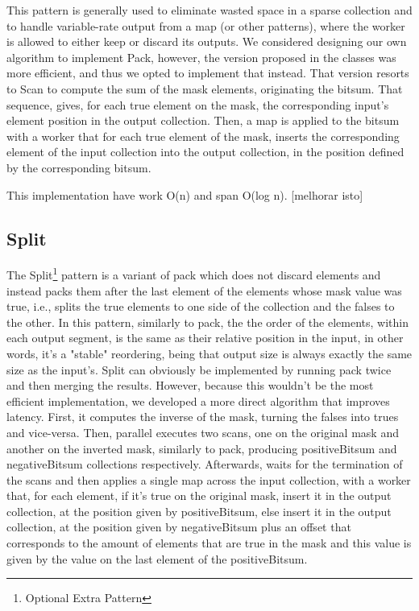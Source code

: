 \documentclass[conference,compsoc]{IEEEtran}
\begin{document}
This pattern is generally used to eliminate wasted space in a sparse collection and to handle variable-rate output from a map (or other patterns), where the worker is allowed to either keep or discard its outputs.
We considered designing our own algorithm to implement Pack, however, the version proposed in the classes was more efficient, and thus we opted to implement that instead. That version resorts to Scan to compute the sum of the mask elements, originating the bitsum. That sequence, gives, for each true element on the mask, the corresponding input's element position in the output collection. Then, a map is applied to the bitsum with a worker that for each true element of the mask, inserts the corresponding element of the input collection into the output collection, in the position defined by the corresponding bitsum.

This implementation have work O(n) and span O(log n). [melhorar isto]

\subsection{Split}

The Split\footnote[1]{Optional Extra Pattern} pattern is a variant of pack which does not discard elements and instead packs them after the last element of the elements whose mask value was true, i.e., splits the true elements to one side of the collection and the falses to the other.
In this pattern, similarly to pack, the the order of the elements, within each output segment, is the same as their relative position in the input, in other words, it's a "stable" reordering, being that output size is always exactly the same size as the input's.
Split can obviously be implemented by running pack twice and then merging the results. However, because this wouldn't be the most efficient implementation, we developed a more direct algorithm that improves latency. First, it computes the inverse of the mask, turning the falses into trues and vice-versa. Then, parallel executes two scans, one on the original mask and another on the inverted mask, similarly to pack, producing positiveBitsum and negativeBitsum collections respectively. Afterwards, waits for the termination of the scans and then applies a single map across the input collection, with a worker that, for each element, if it's true on the original mask, insert it in the output collection, at the position given by positiveBitsum, else insert it in the output collection, at the position given by negativeBitsum plus an offset that corresponds to the amount of elements that are true in the mask and this value is given by the value on the last element of the positiveBitsum.
\end{document}
